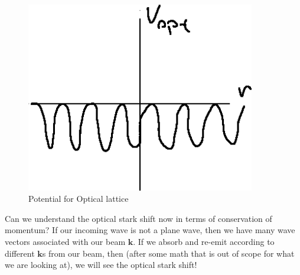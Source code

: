\begin{figure}[h!]
	\centering
	\includegraphics[width=10cm]{images/12-03-2.png}
	\caption*{Potential for Optical lattice}
\end{figure}
Can we understand the optical stark shift now in terms of conservation of momentum? If our incoming wave is not a plane wave, then we have many wave vectors associated with our beam $\bm{k}$.
If we absorb and re-emit according to different $\bm{k}$s from our beam, then (after some math that is out of scope for what we are looking at), we will see the optical stark shift!
